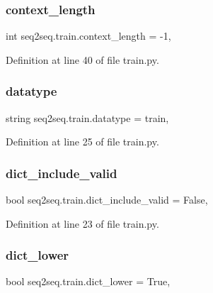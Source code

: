 \subsubsection{\texorpdfstring{context\+\_\+length}{context\_length}}
{\footnotesize\ttfamily int seq2seq.\+train.\+context\+\_\+length = -\/1,}



Definition at line 40 of file train.\+py.

\mbox{\label{namespaceseq2seq_1_1train_a9d1d27146439483fe7b8aeb5cacd2a70}} 
\subsubsection{\texorpdfstring{datatype}{datatype}}
{\footnotesize\ttfamily string seq2seq.\+train.\+datatype = \textquotesingle{}train\textquotesingle{},}



Definition at line 25 of file train.\+py.

\mbox{\label{namespaceseq2seq_1_1train_a19397c41047fceb6f49f39623d513e38}} 
\subsubsection{\texorpdfstring{dict\+\_\+include\+\_\+valid}{dict\_include\_valid}}
{\footnotesize\ttfamily bool seq2seq.\+train.\+dict\+\_\+include\+\_\+valid = False,}



Definition at line 23 of file train.\+py.

\mbox{\label{namespaceseq2seq_1_1train_a4bec0423a520cd189e9d8261b0642ec3}} 
\subsubsection{\texorpdfstring{dict\+\_\+lower}{dict\_lower}}
{\footnotesize\ttfamily bool seq2seq.\+train.\+dict\+\_\+lower = True,}



